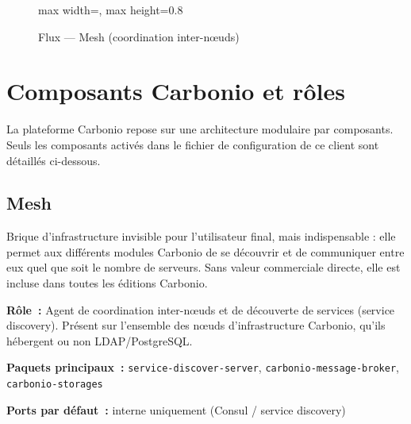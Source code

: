 \documentclass[11pt,a4paper]{report}
\begin{document}
\begin{landscape}
\begin{figure}[h!]
\begin{adjustbox}{max width=\textwidth, max height=0.8\textheight}
\end{adjustbox}
\caption{Flux --- Mesh (coordination inter-\allowbreak{}nœuds)}
\end{figure}

\end{landscape}

\clearpage
\section{Composants Carbonio et rôles}
La plateforme Carbonio repose sur une architecture modulaire par composants. Seuls les composants activés dans le fichier de configuration de ce client sont détaillés ci-dessous.

\subsection{Mesh}

Brique d'infrastructure invisible pour l'utilisateur final, mais indispensable : elle permet aux différents modules Carbonio de se découvrir et de communiquer entre eux quel que soit le nombre de serveurs.\allowbreak{} Sans valeur commerciale directe, elle est incluse dans toutes les éditions Carbonio.\allowbreak{}

\textbf{Rôle~:} Agent de coordination inter-\allowbreak{}nœuds et de découverte de services (service discovery).\allowbreak{} Présent sur l'ensemble des nœuds d'infrastructure Carbonio, qu'ils hébergent ou non LDAP/PostgreSQL.\allowbreak{}

\textbf{Paquets principaux~:} \texttt{service-\allowbreak{}discover-\allowbreak{}server}, \texttt{carbonio-\allowbreak{}message-\allowbreak{}broker}, \texttt{carbonio-\allowbreak{}storages}

\textbf{Ports par défaut~:} interne uniquement (Consul / service discovery)
\end{document}
